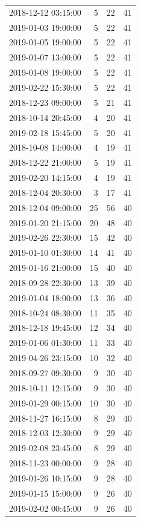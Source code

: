 \begin{tabular}{lrrr}
2018-12-12 03:15:00 & 5 & 22 & 41 \\
2019-01-03 19:00:00 & 5 & 22 & 41 \\
2019-01-05 19:00:00 & 5 & 22 & 41 \\
2019-01-07 13:00:00 & 5 & 22 & 41 \\
2019-01-08 19:00:00 & 5 & 22 & 41 \\
2019-02-22 15:30:00 & 5 & 22 & 41 \\
2018-12-23 09:00:00 & 5 & 21 & 41 \\
2018-10-14 20:45:00 & 4 & 20 & 41 \\
2019-02-18 15:45:00 & 5 & 20 & 41 \\
2018-10-08 14:00:00 & 4 & 19 & 41 \\
2018-12-22 21:00:00 & 5 & 19 & 41 \\
2019-02-20 14:15:00 & 4 & 19 & 41 \\
2018-12-04 20:30:00 & 3 & 17 & 41 \\
2018-12-04 09:00:00 & 25 & 56 & 40 \\
2019-01-20 21:15:00 & 20 & 48 & 40 \\
2019-02-26 22:30:00 & 15 & 42 & 40 \\
2019-01-10 01:30:00 & 14 & 41 & 40 \\
2019-01-16 21:00:00 & 15 & 40 & 40 \\
2018-09-28 22:30:00 & 13 & 39 & 40 \\
2019-01-04 18:00:00 & 13 & 36 & 40 \\
2018-10-24 08:30:00 & 11 & 35 & 40 \\
2018-12-18 19:45:00 & 12 & 34 & 40 \\
2019-01-06 01:30:00 & 11 & 33 & 40 \\
2019-04-26 23:15:00 & 10 & 32 & 40 \\
2018-09-27 09:30:00 & 9 & 30 & 40 \\
2018-10-11 12:15:00 & 9 & 30 & 40 \\
2019-01-29 00:15:00 & 10 & 30 & 40 \\
2018-11-27 16:15:00 & 8 & 29 & 40 \\
2018-12-03 12:30:00 & 9 & 29 & 40 \\
2019-02-08 23:45:00 & 8 & 29 & 40 \\
2018-11-23 00:00:00 & 9 & 28 & 40 \\
2019-01-26 10:15:00 & 9 & 28 & 40 \\
2019-01-15 15:00:00 & 9 & 26 & 40 \\
2019-02-02 00:45:00 & 9 & 26 & 40 \\

\end{tabular}
